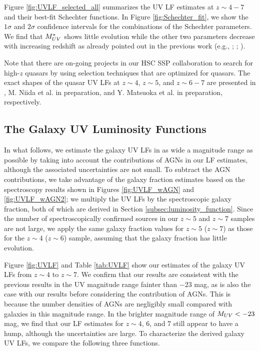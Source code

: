 \documentclass[]{pasj01}
\begin{document}
Figure \ref{fig:UVLF_selected_all} summarizes 
the UV LF estimates at $z \sim 4-7$ and their best-fit Schechter functions.  
In Figure \ref{fig:Schechter_fit}, 
we show the $1\sigma$ and $2\sigma$ confidence intervals 
for the combinations of the Schechter parameters. 
We find that 
$M_{\rm UV}^\ast$ shows little evolution 
while 
the other two parameters decrease with increasing redshift 
as already pointed out in the previous work 
(e.g., \cite{2015ApJ...803...34B}; \cite{2015MNRAS.452.1817B}; 
\cite{2015ApJ...810...71F}). 



Note that 
there are on-going projects in our HSC SSP collaboration 
to search for high-$z$ quasars by using selection techniques 
that are optimized for quasars. 
The exact shapes of the quasar UV LFs at $z \sim 4$, $z \sim 5$, and $z \sim 6-7$ 
are presented in \citet{2017arXiv170405996A}, M. Niida et al. in preparation, 
and Y. Matsuoka et al. in preparation, respectively. 



\subsection{The Galaxy UV Luminosity Functions} 



In what follows, we estimate the galaxy UV LFs in as wide a magnitude range as possible 
by taking into account the contributions of AGNs in our LF estimates, 
although the associated uncertainties are not small.  
To subtract the AGN contributions, 
we take advantage of the galaxy fraction estimates based on the spectroscopy results 
shown in Figures \ref{fig:UVLF_wAGN} and \ref{fig:UVLF_wAGN2}; 
we multiply the UV LFs by the spectroscopic galaxy fraction, 
both of which are derived in Section \ref{subsec:luminosity_function}. 
Since the number of spectroscopically confirmed sources 
in our $z \sim 5$ and $z \sim 7$ samples are not large, 
we apply the same galaxy fraction values for $z \sim 5$ ($z \sim 7$)  
as those for the $z \sim 4$ ($z \sim 6$) sample,  
assuming that the galaxy fraction has little evolution.  



Figure \ref{fig:UVLF} and Table \ref{tab:UVLF} 
show our estimates of the galaxy UV LFs from $z \sim 4$ to $z \sim 7$. 
We confirm that 
our results are consistent with the previous results 
in the UV magnitude range fainter than $-23$ mag, 
as is also the case with our results before considering the contribution of AGNs. 
This is because 
the number densities of AGNs are negligibly small compared with galaxies in this magnitude range. 
In the brighter magnitude range of $M_{\rm UV} < -23$ mag, 
we find that 
our LF estimates for $z \sim 4$, $6$, and $7$ still appear to have a hump, 
although the uncertainties are large. 
To characterize the derived galaxy UV LFs, 
we compare the following three functions. 
\end{document}
